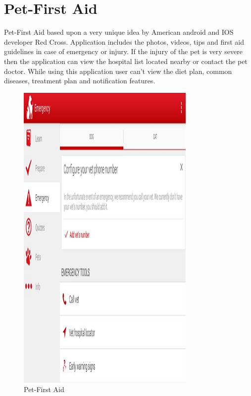 \section{Pet-First Aid\cite{petfirstage}}
Pet-First Aid based upon a very unique idea by American android and IOS developer Red Cross. Application includes the photos, videos, tips and first aid guidelines in case of emergency or injury. If the injury of the pet is very severe then the application can view the hospital list located nearby or contact the pet doctor. While using this application user can’t view the diet plan, common diseases, treatment plan and notification features.
\begin{figure}[H]
  \centering
    \includegraphics[scale=0.3]{27petfirstaid}
    \caption{Pet-First Aid}
\end{figure}

